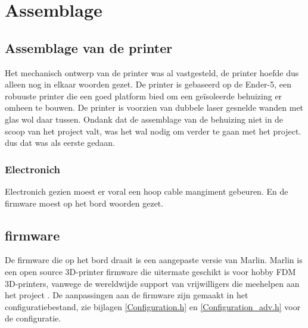 \chapter{Assemblage}
\label{Assemblage}

\section{Assemblage van de printer}

Het mechanisch ontwerp van de printer was al vastgesteld, de printer hoefde dus
alleen nog in elkaar woorden gezet. De printer is gebaseerd op de Ender-5, een
robuuste printer die een goed platform bied om een geïsoleerde behuizing  er
omheen te bouwen. De printer is voorzien van dubbele laser gesnelde wanden met
glas wol daar tussen. Ondank dat de assemblage van de behuizing niet in de
scoop van het project valt, was het wal nodig om verder te gaan met het
project. dus dat was als eerste gedaan.

\subsection{Electronich}

Electronich gezien moest er voral een hoop cable mangiment gebeuren. En de
firmware moest op het bord woorden gezet.

\section{firmware}

De firmware die op het bord draait is een aangepaste versie van Marlin. Marlin
is een open source 3D-printer firmware die uitermate geschikt is voor hobby FDM
3D-printers, vanwege de wereldwijde support van vrijwilligers die meehelpen aan
het project \cite{Marlin}. De aanpassingen aan de firmware zijn gemaakt in het
configuratiebestand, zie bijlagen \ref{Configuration.h} en
\ref{Configuration_adv.h} voor de configuratie.

